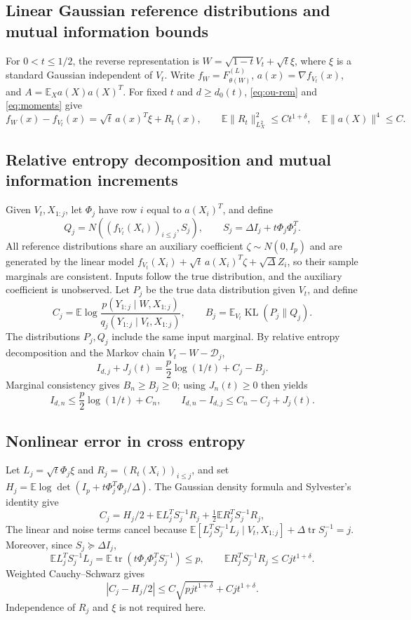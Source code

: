 \documentclass[a4paper]{tufte-handout}
\newcommand{\E}{\mathbb E}
\DeclareMathOperator{\tr}{tr}
\DeclareMathOperator{\KL}{KL}
\begin{document}
\begin{fullwidth}
\section{Linear Gaussian reference distributions and mutual information bounds}
For $0<t\le1/2$, the reverse representation is
$W=\sqrt{1-t}V_t+\sqrt t\xi$, where $\xi$ is a standard Gaussian independent of $V_t$.
Write $f_W=F_{\theta(W)}^{(L)}$, $a(x)=\nabla f_{V_t}(x)$, and
$A=\E_Xa(X)a(X)^T$. For fixed $t$ and $d\ge d_0(t)$, \eqref{eq:ou-rem} and \eqref{eq:moments} give
\[
 f_W(x)-f_{V_t}(x)=\sqrt t\,a(x)^T\xi+R_t(x),\qquad
 \E\|R_t\|_{L_X^2}^2\le Ct^{1+\delta},\quad
 \E\|a(X)\|^4\le C.
\]


\subsection{Relative entropy decomposition and mutual information increments}
Given $V_t,X_{1:j}$, let $\Phi_j$ have row $i$ equal to $a(X_i)^T$, and define
\[
 Q_j=N\!\left((f_{V_t}(X_i))_{i\le j},S_j\right),
 \qquad S_j=\Delta I_j+t\Phi_j\Phi_j^T.
\]
All reference distributions share an auxiliary coefficient $\zeta\sim N(0,I_p)$ and are generated by the linear model
$f_{V_t}(X_i)+\sqrt t\,a(X_i)^T\zeta+\sqrt\Delta Z_i$,
so their sample marginals are consistent. Inputs follow the true distribution, and the auxiliary coefficient is unobserved.
Let $P_j$ be the true data distribution given $V_t$, and define
\[
 C_j=\E\log\frac{p(Y_{1:j}\mid W,X_{1:j})}
 {q_j(Y_{1:j}\mid V_t,X_{1:j})},\qquad
 B_j=\E_{V_t}\KL(P_j\|Q_j).
\]
The distributions $P_j,Q_j$ include the same input marginal. By relative entropy decomposition and the Markov chain $V_t-W-\mathcal D_j$,
\begin{equation}\label{info:reference-identity}
 I_{d,j}+J_j(t)=\frac p2\log(1/t)+C_j-B_j.
\end{equation}
Marginal consistency gives $B_n\ge B_j\ge0$; using $J_n(t)\ge0$ then yields
\begin{equation}\label{alt:block-entropy}
 I_{d,n}\le\frac p2\log(1/t)+C_n,\qquad
 I_{d,n}-I_{d,j}\le C_n-C_j+J_j(t).
\end{equation}

\subsection{Nonlinear error in cross entropy}
Let $L_j=\sqrt t\Phi_j\xi$ and $R_j=(R_t(X_i))_{i\le j}$, and set
$H_j=\E\log\det(I_p+t\Phi_j^T\Phi_j/\Delta)$.
The Gaussian density formula and Sylvester's identity give
\[
 C_j=H_j/2+\E L_j^TS_j^{-1}R_j+\tfrac12\E R_j^TS_j^{-1}R_j,
\]
The linear and noise terms cancel because
$\E[L_j^TS_j^{-1}L_j\mid V_t,X_{1:j}]+\Delta\tr S_j^{-1}=j$.
Moreover, since $S_j\succeq\Delta I_j$,
\[
 \E L_j^TS_j^{-1}L_j=\E\tr(t\Phi_j\Phi_j^TS_j^{-1})\le p,
 \qquad \E R_j^TS_j^{-1}R_j\le Cjt^{1+\delta}.
\]
Weighted Cauchy--Schwarz gives
\begin{equation}\label{alt:cross-entropy}
 |C_j-H_j/2|\le C\sqrt{pj t^{1+\delta}}+Cjt^{1+\delta}.
\end{equation}
Independence of $R_j$ and $\xi$ is not required here.


\end{fullwidth}
\end{document}
